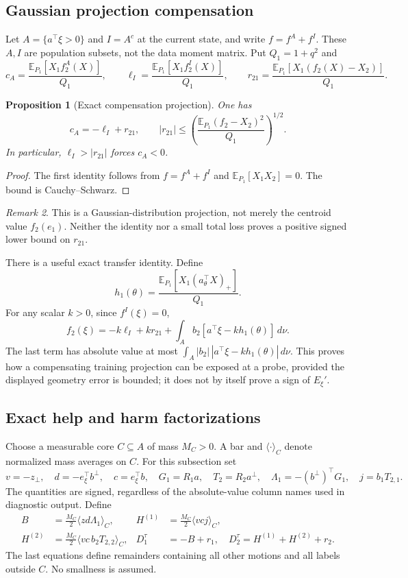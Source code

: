 \documentclass[11pt]{article}
\numberwithin{equation}{section}
\newtheorem{proposition}{Proposition}[section]
\theoremstyle{definition}
\theoremstyle{remark}
\newtheorem{remark}[proposition]{Remark}
\newcommand{\E}{\mathbb E}
\newcommand{\1}{\mathbf 1}
\newcommand{\dd}{\,d}
\begin{document}
\subsection{Gaussian projection compensation}
Let $A=\{a^\top\xi>0\}$ and $I=A^c$ at the current state, and write
$f=f^A+f^I$. These $A,I$ are population subsets, not the data moment matrix.
Put $Q_1=1+q^2$ and
\[
 c_A=\frac{\E_{P_1}[X_1f_2^A(X)]}{Q_1},\qquad
 \ell_I=\frac{\E_{P_1}[X_1f_2^I(X)]}{Q_1},\qquad
 r_{21}=\frac{\E_{P_1}[X_1(f_2(X)-X_2)]}{Q_1}.
\]
\begin{proposition}[Exact compensation projection]\label{pa:projection}
One has
\begin{equation}\label{pa:projection-eq}
 c_A=-\ell_I+r_{21},\qquad
 |r_{21}|\le
 \left(\frac{\E_{P_1}(f_2-X_2)^2}{Q_1}\right)^{1/2}.
\end{equation}
In particular, $\ell_I>|r_{21}|$ forces $c_A<0$.
\end{proposition}
\begin{proof}
The first identity follows from $f=f^A+f^I$ and
$\E_{P_1}[X_1X_2]=0$. The bound is Cauchy--Schwarz.
\end{proof}
\begin{remark}
This is a Gaussian-distribution projection, not merely the centroid value
$f_2(e_1)$. Neither the identity nor a small total loss proves a positive
signed lower bound on $r_{21}$.
\end{remark}

There is a useful exact transfer identity. Define
\[
 h_1(\theta)=\frac{\E_{P_1}[X_1(a_\theta^\top X)_+]}{Q_1}.
\]
For any scalar $k>0$, since $f^I(\xi)=0$,
\begin{equation}\label{pa:transferprojection}
 f_2(\xi)=-k\ell_I+kr_{21}
 +\int_A b_2[a^\top\xi-kh_1(\theta)]\dd\nu.
\end{equation}
The last term has absolute value at most
$\int_A|b_2|\,|a^\top\xi-kh_1(\theta)|\dd\nu$.
This proves how a compensating training projection can be exposed at a probe,
provided the displayed geometry error is bounded; it does not by itself
prove a sign of $E_\xi'$.

\subsection{Exact help and harm factorizations}
Choose a measurable core $C\subseteq A$ of mass $M_C>0$. A bar and
$\langle\cdot\rangle_C$ denote normalized mass averages on $C$.
For this subsection set
\[
 v=-z_\perp,\quad d=-e_\xi^\top b^\perp,\quad c=e_\xi^\top b,
 \quad G_1=R_1a,\quad T_2=R_2a^\perp,\quad
 \Lambda_1=-(b^\perp)^\top G_1,\quad j=b_1T_{2,1}.
\]
The quantities are signed, regardless of the absolute-value column names
used in diagnostic output. Define
\begin{align}
 B&=\frac{M_C}{2}\langle zd\Lambda_1\rangle_C,&
 H^{(1)}&=\frac{M_C}{2}\langle vcj\rangle_C,\label{pa:BH}\\
 H^{(2)}&=\frac{M_C}{2}\langle vc\,b_2T_{2,2}\rangle_C,&
 D_1^\tau&=-B+r_1,\quad
 D_2^\tau=H^{(1)}+H^{(2)}+r_2.\nonumber
\end{align}
The last equations define remainders containing all other motions and all
labels outside $C$. No smallness is assumed.
\end{document}
